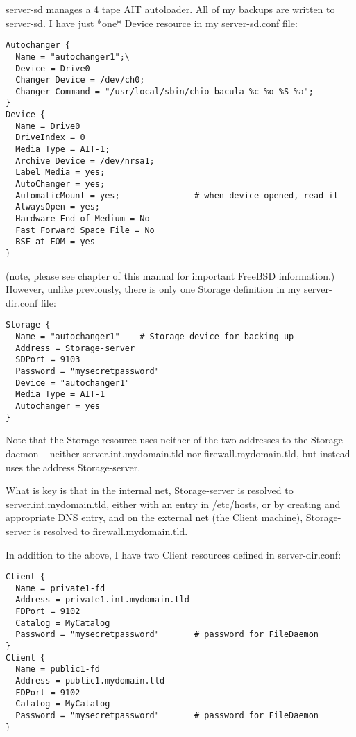 server-sd manages a 4 tape AIT autoloader. All of my backups are written to
server-sd. I have just *one* Device resource in my server-sd.conf file: 

\footnotesize
\begin{verbatim}
Autochanger {
  Name = "autochanger1";\
  Device = Drive0
  Changer Device = /dev/ch0;
  Changer Command = "/usr/local/sbin/chio-bacula %c %o %S %a";
}
Device {
  Name = Drive0
  DriveIndex = 0
  Media Type = AIT-1;
  Archive Device = /dev/nrsa1;
  Label Media = yes;
  AutoChanger = yes;
  AutomaticMount = yes;               # when device opened, read it
  AlwaysOpen = yes;
  Hardware End of Medium = No
  Fast Forward Space File = No
  BSF at EOM = yes
}
\end{verbatim}
\normalsize

(note, please see 
 chapter of this manual
for important FreeBSD information.) However, unlike previously, there
is only one Storage definition in my server-dir.conf file: 

\footnotesize
\begin{verbatim}
Storage {
  Name = "autochanger1"    # Storage device for backing up
  Address = Storage-server
  SDPort = 9103
  Password = "mysecretpassword"
  Device = "autochanger1"
  Media Type = AIT-1
  Autochanger = yes
}
\end{verbatim}
\normalsize

Note that the Storage resource uses neither of the two addresses to
the Storage daemon -- neither server.int.mydomain.tld nor
firewall.mydomain.tld, but instead uses the address Storage-server.

What is key is that in the internal net, Storage-server is resolved
to server.int.mydomain.tld, either with an entry in /etc/hosts, or by
creating and appropriate DNS entry, and on the external net (the Client
machine), Storage-server is resolved to firewall.mydomain.tld.


In addition to the above, I have two Client resources defined in
server-dir.conf: 

\footnotesize
\begin{verbatim}
Client {
  Name = private1-fd
  Address = private1.int.mydomain.tld
  FDPort = 9102
  Catalog = MyCatalog
  Password = "mysecretpassword"       # password for FileDaemon
}
Client {
  Name = public1-fd
  Address = public1.mydomain.tld
  FDPort = 9102
  Catalog = MyCatalog
  Password = "mysecretpassword"       # password for FileDaemon
}
\end{verbatim}
\normalsize

